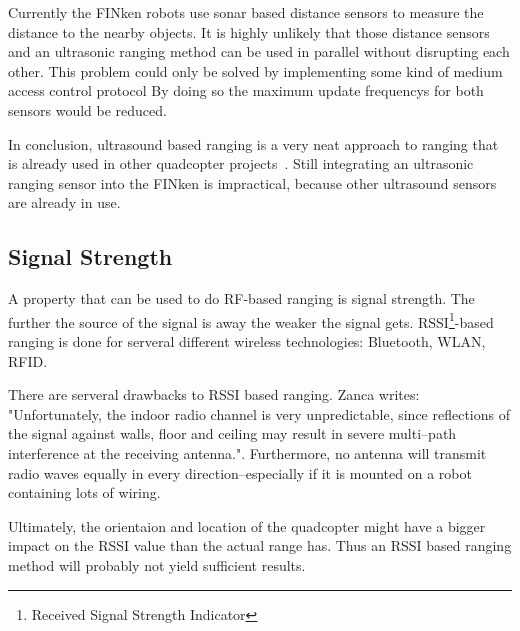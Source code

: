 Currently the FINken robots use sonar based distance sensors to measure the distance to the nearby objects.
It is highly unlikely that those distance sensors and an ultrasonic ranging method can be used in parallel without disrupting each other.
This problem could only be solved by implementing some kind of medium access control protocol
By doing so the maximum update frequencys for both sensors would be reduced.


In conclusion, ultrasound based ranging is a very neat approach to ranging that is already used in other quadcopter projects~\cite{ultrasonic_erlangen}.
Still integrating an ultrasonic ranging sensor into the FINken is impractical, because other ultrasound sensors are already in use.


\subsection{Signal Strength}

A property that can be used to do RF-based ranging is signal strength.
The further the source of the signal is away the weaker the signal gets.
RSSI\footnote{Received Signal Strength Indicator}-based ranging is done for serveral different wireless technologies: Bluetooth\cite{pei_using_2010}, WLAN\cite{wlanrssi, wlanrssi2}, RFID\cite{rfidrssi}.

There are serveral drawbacks to RSSI based ranging. Zanca \cite{Zanca} writes: "Unfortunately, the indoor radio channel is very
unpredictable, since reflections of the signal against walls, floor and ceiling may result in severe multi–path interference at the receiving antenna.".
Furthermore, no antenna will transmit radio waves equally in every direction–especially if it is mounted on a robot containing lots of wiring.

Ultimately, the orientaion and location of the quadcopter might have a bigger impact on the RSSI value than the actual range has.
Thus an RSSI based ranging method will probably not yield sufficient results.


